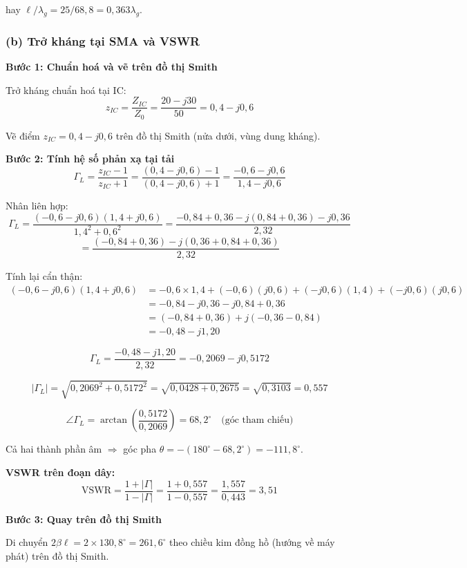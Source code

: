 \documentclass[12pt,a4paper]{article}
\begin{document}
hay $\ell/\lambda_g = 25/68{,}8 = 0{,}363\lambda_g$.

\subsubsection{(b) Trở kháng tại SMA và VSWR}

\textbf{Bước 1: Chuẩn hoá và vẽ trên đồ thị Smith}

Trở kháng chuẩn hoá tại IC:
\[
z_{IC} = \frac{Z_{IC}}{Z_0} = \frac{20 - j30}{50} = 0{,}4 - j0{,}6
\]

Vẽ điểm $z_{IC} = 0{,}4 - j0{,}6$ trên đồ thị Smith (nửa dưới, vùng dung kháng).

\textbf{Bước 2: Tính hệ số phản xạ tại tải}
\[
\Gamma_L = \frac{z_{IC} - 1}{z_{IC} + 1} = \frac{(0{,}4 - j0{,}6) - 1}{(0{,}4 - j0{,}6) + 1} = \frac{-0{,}6 - j0{,}6}{1{,}4 - j0{,}6}
\]

Nhân liên hợp:
\[
\Gamma_L = \frac{(-0{,}6 - j0{,}6)(1{,}4 + j0{,}6)}{1{,}4^2 + 0{,}6^2} = \frac{-0{,}84 + 0{,}36 - j(0{,}84 + 0{,}36) - j0{,}36}{2{,}32}
\]
\[
= \frac{(-0{,}84+0{,}36) - j(0{,}36 + 0{,}84 + 0{,}36)}{2{,}32}
\]

Tính lại cẩn thận:
\begin{align*}
(-0{,}6 - j0{,}6)(1{,}4 + j0{,}6) &= -0{,}6 \times 1{,}4 + (-0{,}6)(j0{,}6) + (-j0{,}6)(1{,}4) + (-j0{,}6)(j0{,}6) \\
&= -0{,}84 - j0{,}36 - j0{,}84 + 0{,}36 \\
&= (-0{,}84 + 0{,}36) + j(-0{,}36 - 0{,}84) \\
&= -0{,}48 - j1{,}20
\end{align*}

\[
\Gamma_L = \frac{-0{,}48 - j1{,}20}{2{,}32} = -0{,}2069 - j0{,}5172
\]

\[
|\Gamma_L| = \sqrt{0{,}2069^2 + 0{,}5172^2} = \sqrt{0{,}0428 + 0{,}2675} = \sqrt{0{,}3103} = 0{,}557
\]

\[
\angle\Gamma_L = \arctan\left(\frac{0{,}5172}{0{,}2069}\right) = 68{,}2^\circ \quad \text{(góc tham chiếu)}
\]

Cả hai thành phần âm $\Rightarrow$ góc pha $\theta = -(180^\circ - 68{,}2^\circ) = -111{,}8^\circ$.

\textbf{VSWR trên đoạn dây:}
\[
\boxed{\text{VSWR} = \frac{1 + |\Gamma|}{1 - |\Gamma|} = \frac{1 + 0{,}557}{1 - 0{,}557} = \frac{1{,}557}{0{,}443} = 3{,}51}
\]

\textbf{Bước 3: Quay trên đồ thị Smith}

Di chuyển $2\beta\ell = 2 \times 130{,}8^\circ = 261{,}6^\circ$ theo chiều kim đồng hồ (hướng về máy phát) trên đồ thị Smith.
\end{document}
